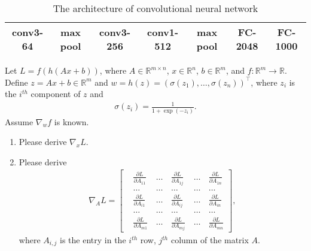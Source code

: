 \documentclass[11pt,letter,notitlepage]{article}
\begin{document}
\begin{table}[h]
	\centering
	\begin{tabular}{|c|c|c|c|c|c|c|}
		\hline
		conv3-64 & max pool & conv3-256 & conv1-512 & max pool & FC-2048 & FC-1000 \\
		\hline
	\end{tabular}
	\caption{The architecture of convolutional neural network} \label{tab:cnn}
\end{table}
\begin{solution}

\end{solution}

\newpage

\begin{exercise}

	\indent Let $L = f(h(Ax+b))$, where $A \in \mathbb{R}^{m \times n}$, $x \in \mathbb{R}^n$, $b \in \mathbb{R}^m$, and $f: \mathbb{R}^m \rightarrow \mathbb{R}$. Define $z =  Ax + b \in \mathbb{R}^m$ and $w =  h(z)  = ( \sigma(z_1),\ldots,\sigma(z_n) )^{\top}$, where $z_i$ is the $i^{th}$ component of $z$ and
	\begin{align*}
		\sigma(z_i) = \frac{1}{1+\exp(-z_i)}.
	\end{align*}
	Assume $\nabla_w f$ is known.
	\begin{enumerate}
		\item Please derive $\nabla_{x}L$.
		\item Please derive
		      \begin{align*}
			      \nabla_{A}L = \left[
				      \begin{matrix}
					       & \frac{\partial L}{\partial A_{11}} & \, \dots \, & \frac{\partial L}{\partial A_{1j}} & \, \dots \, & \frac{\partial L}{\partial A_{1n}} \\
					       & \dots                              & \, \dots \, & \dots                              & \, \dots \, & \dots                              \\
					       & \frac{\partial L}{\partial A_{i1}} & \, \dots \, & \frac{\partial L}{\partial A_{ij}} & \, \dots \, & \frac{\partial L}{\partial A_{in}} \\
					       & \dots                              & \, \dots \, & \dots                              & \, \dots \, & \dots                              \\
					       & \frac{\partial L}{\partial A_{m1}} & \, \dots \, & \frac{\partial L}{\partial A_{mj}} & \, \dots \, & \frac{\partial L}{\partial A_{mn}}
				      \end{matrix}
				      \right],
		      \end{align*}
		      where $A_{i,j}$ is the entry in the $i^{th}$ row, $j^{th}$ column of the matrix $A$.
	\end{enumerate}

\end{exercise}
\begin{solution}

\end{solution}



\end{document}
